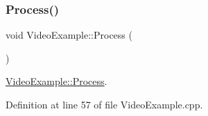 \mbox{\label{class_video_example_a87efc66a82c36ad3380623d30a12abf2}} 
\subsubsection{\texorpdfstring{Process()}{Process()}}
{\footnotesize\ttfamily void Video\+Example\+::\+Process (\begin{DoxyParamCaption}{ }\end{DoxyParamCaption})\hspace{0.3cm}{\ttfamily [inherited]}}



\mbox{\hyperlink{class_video_example_a87efc66a82c36ad3380623d30a12abf2}{Video\+Example\+::\+Process}}. 



Definition at line 57 of file Video\+Example.\+cpp.


